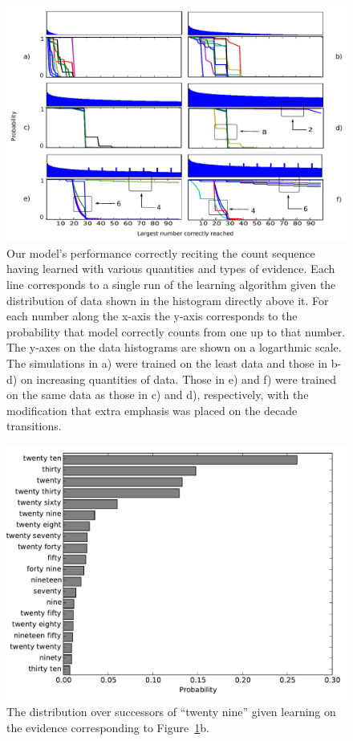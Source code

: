 \documentclass[10pt,letterpaper]{article}
\begin{document}
\begin{figure}[t]
\includegraphics[width=\linewidth]{figures/counting_grid2}
\caption{Our model's performance correctly reciting the count sequence
  having learned with various quantities and types of evidence. Each
  line corresponds to a single run of the learning algorithm given the
  distribution of data shown in the histogram directly above it. For
  each number along the x-axis the y-axis corresponds to the
  probability that model correctly counts from one up to that
  number. The y-axes on the data histograms are shown on a logarthmic
  scale. The simulations in a) were trained on the least data and
  those in b-d) on increasing quantities of data. Those in e) and f)
  were trained on the same data as those in c) and d), respectively,
  with the modification that extra emphasis was placed on the decade
  transitions. \label{fig:counting_grid}}
\end{figure}


\begin{figure}[t]
\includegraphics[width=0.9\linewidth]{figures/after29}
\caption{The distribution over successors of ``twenty nine'' given learning on the evidence corresponding to Figure~\ref{fig:counting_grid}b. \label{fig:after29}}
\end{figure}
\end{document}
